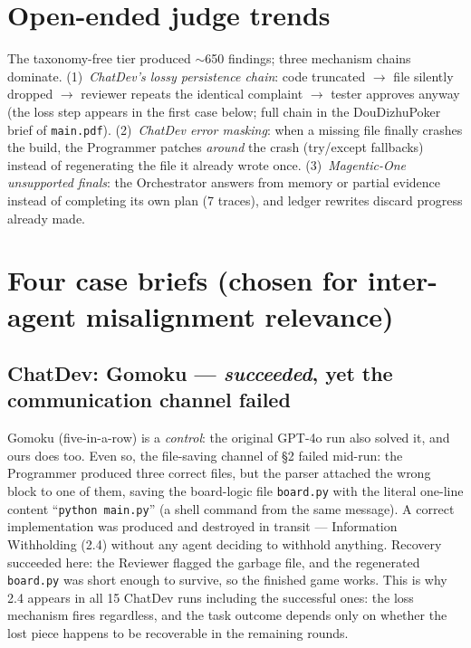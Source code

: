 \documentclass[10pt]{article}
\begin{document}
\section{Open-ended judge trends}
The taxonomy-free tier produced $\sim$650 findings; three mechanism chains
dominate. (1)~\emph{ChatDev's lossy persistence chain}: code truncated
$\rightarrow$ file silently dropped $\rightarrow$ reviewer repeats the
identical complaint $\rightarrow$ tester approves anyway (the loss step
appears in the first case below; full chain in the DouDizhuPoker brief of
\texttt{main.pdf}). (2)~\emph{ChatDev error masking}: when a missing
file finally crashes the build, the Programmer patches \emph{around} the
crash (try/except fallbacks) instead of regenerating the file it already
wrote once. (3)~\emph{Magentic-One unsupported finals}: the Orchestrator
answers from memory or partial evidence instead of completing its own plan
(7 traces), and ledger rewrites discard progress already made.

\section{Four case briefs (chosen for inter-agent misalignment relevance)}
\small

\subsection*{ChatDev: Gomoku --- \emph{succeeded}, yet the communication channel failed}
Gomoku (five-in-a-row) is a \emph{control}: the original GPT-4o run also
solved it, and ours does too. Even so, the file-saving channel of \S2 failed
mid-run: the Programmer produced three correct files, but the parser
attached the wrong block to one of them, saving the board-logic file
\texttt{board.py} with the literal one-line content ``\texttt{python
main.py}'' (a shell command from the same message). A correct implementation
was produced and destroyed in transit --- Information Withholding (2.4)
without any agent deciding to withhold anything. Recovery succeeded here:
the Reviewer flagged the garbage file, and the regenerated \texttt{board.py}
was short enough to survive, so the finished game works. This is why 2.4
appears in all 15 ChatDev runs including the successful ones: the loss
mechanism fires regardless, and the task outcome depends only on whether the
lost piece happens to be recoverable in the remaining rounds.
\end{document}
